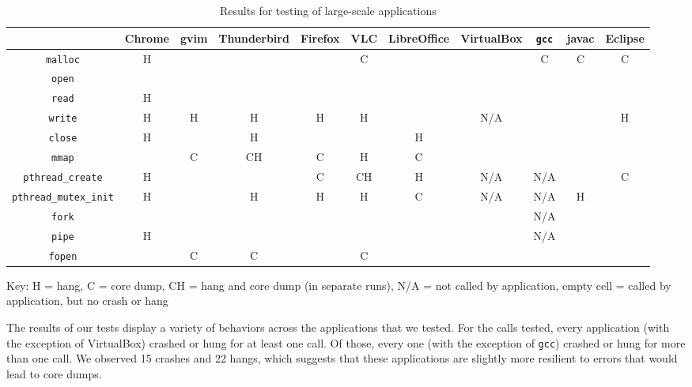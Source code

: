 \begin{table}[h!]
\centering
\caption{Results for testing of large-scale applications}
		\begin{adjustbox}{width=\textwidth}
		\begin{tabular}{|c|c|c|c|c|c|c|c|c|c|c|}
			\hline
			& Chrome & gvim & Thunderbird & Firefox & VLC & LibreOffice & VirtualBox & \texttt{gcc} & javac & Eclipse\\
			\hline
			\texttt{malloc} & H & & & & C &  & & C & C & C \\ \hline
			\texttt{open} & & & & & & & & & & \\ \hline
			\texttt{read} & H & & & & & & & & & \\ \hline
			\texttt{write} & H & H & H & H & H & & N/A& & & H \\ \hline
			\texttt{close} & H & & H & & & H & & & & \\ \hline
			\texttt{mmap} & & C & CH & C & H & C & & & &\\ \hline
			\texttt{pthread\_create}& H & &  & C & CH & H & N/A& N/A& & C \\ \hline
			\texttt{pthread\_mutex\_init} & H & & H & H & H & C & N/A& N/A & H &  \\ \hline
			\texttt{fork} & & & & & & & & N/A & & \\ \hline
			\texttt{pipe} & H & & & & & &  & N/A & &\\ \hline
			\texttt{fopen} & & C & C & & C & & & & & \\ \hline
		\end{tabular} 
		\end{adjustbox}
		Key: H = hang, C = core dump, CH = hang and core dump (in separate runs), N/A = not called by application, empty cell = called by application, but no crash or hang
\label{table:large_scale}
\end{table}

The results of our tests display a variety of behaviors across the applications that we tested. For the calls tested, every application (with the exception of VirtualBox) crashed or hung for at least one call. Of those, every one (with the exception of \texttt{gcc}) crashed or hung for more than one call. We observed 15 crashes and 22 hangs, which suggests that these applications are slightly more resilient to errors that would lead to core dumps. 

